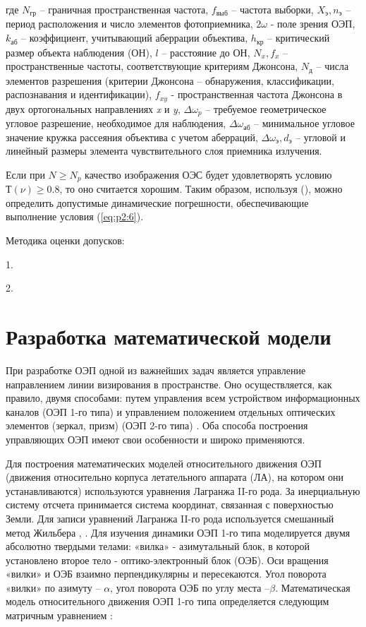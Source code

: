 где 
$N_{\textit{гр}}$ – граничная пространственная частота, 
$f_{\textit{выб}}$ – частота выборки, 
$X_{\textit{э}} ,n_{\textit{э}}$ –период расположения и число элементов фотоприемника, 
$2\omega$ - поле зрения ОЭП, 
$k_{\textit{аб}}$ – коэффициент, учитывающий аберрации объектива, 
$h_{\textit{кр}}$ – критический размер объекта наблюдения (ОН), 
$l$ – расстояние до ОН, 
$N_{x} , f_{x}$ – пространственные частоты, соответствующие критериям Джонсона, 
$N_{\textit{д}}$ – числа элементов разрешения (критерии Джонсона – обнаружения, классификации, распознавания и идентификации), 
$f_{xy}$ - пространственная частота Джонсона в двух ортогональных направлениях \textit{x} и \textit{y}, 
$\Delta{}{\omega{}}_p$ – требуемое геометрическое угловое разрешение, необходимое для наблюдения, 
$\Delta{}{\omega{}}_{\textit{аб}}$ – минимальное угловое значение кружка рассеяния объектива с учетом аберраций, 
$\Delta{}{\omega{}}_{\textit{э}} , d_{\textit{э}}$ – угловой и линейный размеры элемента чувствительного слоя приемника излучения. 

Если при $N \ge N_p$ качество изображения ОЭС будет удовлетворять условию $Т(\nu) \ge 0.8$, то оно считается хорошим. Таким образом, используя (), можно определить допустимые динамические погрешности, обеспечивающие выполнение условия (\ref{eq:p2:6}).

Методика оценки допусков:

1.

2.


\section{Разработка математической модели} \label{sec:ch2/sec3}

При разработке ОЭП одной из важнейших задач является управление направлением линии визирования в пространстве. Оно осуществляется, как правило, двумя способами: путем управления всем устройством информационных каналов (ОЭП 1-го типа) и управлением положением отдельных оптических элементов (зеркал, призм) (ОЭП 2-го типа) \cite[]{Karpov23}. Оба способа построения управляющих ОЭП имеют свои особенности и широко применяются.

Для построения математических моделей относительного движения ОЭП (движения относительно корпуса летательного аппарата (ЛА), на котором они устанавливаются) используются уравнения Лагранжа II-го рода. За инерциальную систему отсчета принимается система координат, связанная с поверхностью Земли. Для записи уравнений Лагранжа II-го рода используется смешанный метод Жильбера \cite[]{Belyakov}, \cite[]{Baloev16}. Для изучения динамики ОЭП 1-го типа моделируется двумя абсолютно твердыми телами: «вилка» - азимутальный блок, в которой установлено второе тело - оптико-электронный блок (ОЭБ). Оси вращения «вилки» и ОЭБ взаимно перпендикулярны и пересекаются. Угол поворота «вилки» по азимуту – $\alpha$, угол поворота ОЭБ по углу места –$\beta$. Математическая модель относительного движения ОЭП 1-го типа определяется следующим матричным уравнением \cite[]{Karpov23}:

